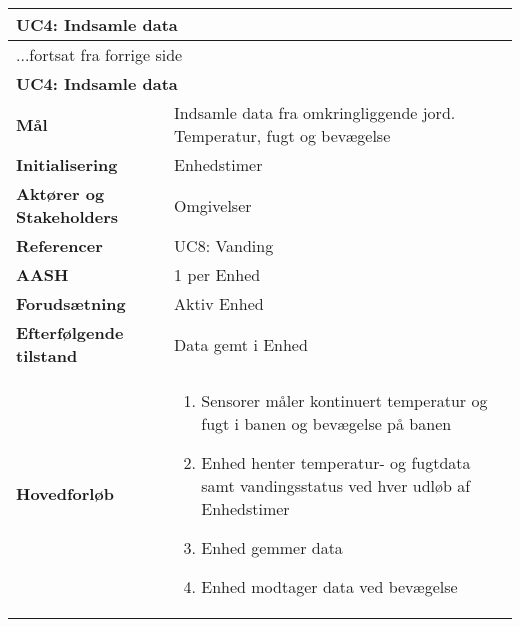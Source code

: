 \begin{center} \centering \label{UC4}
	\begin{longtable}{|p{5cm}|p{9cm}|}  %
	\hline
		\multicolumn{2}{|l|}{\textbf{UC4: Indsamle data}} \\\hline %
		\endfirsthead
		
		\multicolumn{2}{l}{...fortsat fra forrige side} \\ \hline %
		\multicolumn{2}{|l|}{\textbf{UC4: Indsamle data}} \\\hline %
		\endhead	
		
		\textbf{Mål}								&Indsamle data fra omkringliggende jord. Temperatur, fugt og bevægelse			\\\hline
		\textbf{Initialisering}					&Enhedstimer			\\\hline
		\textbf{Aktører og Stakeholders}			&Omgivelser				\\\hline
		\textbf{Referencer}						&UC8: Vanding		\\\hline
		\textbf{AASH}							&1 per Enhed			\\\hline
		\textbf{Forudsætning}					&Aktiv Enhed			\\\hline
		\textbf{Efterfølgende tilstand}			&Data gemt i Enhed 	\\\hline
		\textbf{Hovedforløb}					
			&\begin{enumerate}
	
				\item Sensorer måler kontinuert temperatur og fugt i banen og bevægelse på banen
				
				\item Enhed henter temperatur- og fugtdata samt vandingsstatus ved hver udløb af Enhedstimer
				
				\item Enhed gemmer data				
				
				\item Enhed modtager data ved bevægelse  
				
			\end{enumerate}\\\hline
	\end{longtable}
\end{center}

